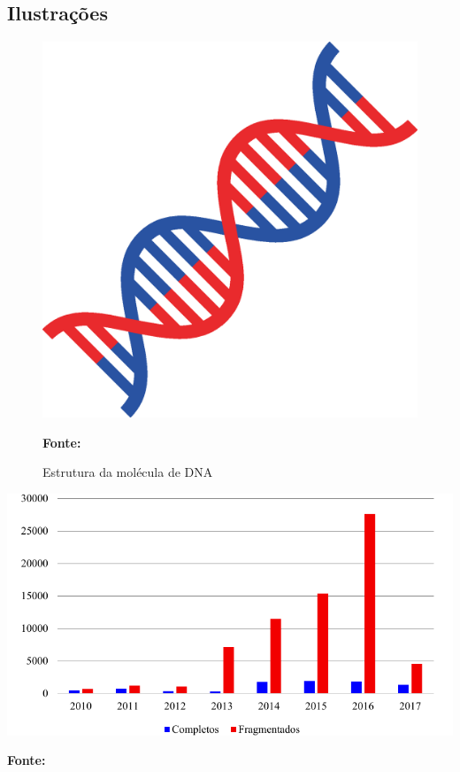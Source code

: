 \documentclass[
	12pt,				%
	openright,			%
	oneside,			%
	a4paper,			%
	chapter=TITLE,		%
	english,			%
	french,				%
	spanish,			%
	brazil				%
	]{abntex2}
\begin{document}
\subsection{Ilustrações}

\begin{figure}[!htb]
	\caption{Estrutura da molécula de DNA}
	\label{fig:dna}
	\centering
	\includegraphics[width=.3\textwidth]{estrutura_dna.eps} \\
	\begin{small}\textbf{Fonte: }\end{small}
\end{figure}

\begin{grafico}[!htb]
	\caption{Projetos de sequenciamento de genomas cadastrados no banco de dados GOLD}
	\label{grafico:gold}
	\centering
	\includegraphics[width=.8\textwidth]{gold.pdf} \\
	\begin{small}\textbf{Fonte: }\end{small}
\end{grafico}
\end{document}

